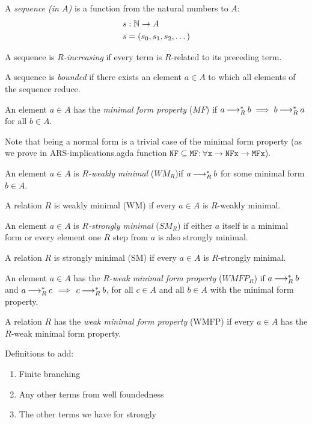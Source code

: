 \begin{definition}
    A \emph{sequence (in $A$)} is a function from the natural numbers to $A$:
    \begin{align*}
      &s : \mathbb{N} \to A \\
      &s = (s_0,s_1,s_2,\dots)
    \end{align*}
\end{definition}

\begin{definition}
    A sequence is \emph{$R$-increasing} if every term is $R$-related to its preceding term.
\end{definition}

\begin{definition}
    A sequence is \emph{bounded} if there exists an element $a \in A$ to which all elements of the sequence reduce.
\end{definition}

\begin{definition}
    An element $a \in A$ has the \emph{minimal form property} ($MF$) if $a \mathbin{\longrightarrow_R^*} b \implies b \mathbin{\longrightarrow_R^*} a$ for all $b \in A$.
\end{definition}

Note that being a normal form is a trivial case of the minimal form property (as we prove in ARS-implications.agda
function $\mathtt{NF\subseteq MF : \forall {x} \to NF x \to MF x}$).

\begin{definition}
    An element $a \in A$ is \emph{$R$-weakly minimal} ($WM_{R}$)if $a \mathbin{\longrightarrow_R^*} b$ for some minimal form $b \in A$.

    A relation $R$ is weakly minimal (WM) if every $a \in A$ is $R$-weakly minimal.
\end{definition}

\begin{definition}
    An element $a \in A$ is \emph{$R$-strongly minimal} ($SM_R$) if either $a$ itself is a minimal form or every element one $R$ step
    from $a$ is also strongly minimal.

    A relation $R$ is strongly minimal (SM) if every
    $a \in A$ is $R$-strongly minimal.
\end{definition}

\begin{definition}
   An element $a \in A$ has the \emph{${R}$-weak minimal form property} ($WMFP_R$) if
   $a \mathbin{\longrightarrow_R^*} b$ and $a \mathbin{\longrightarrow_R^*} c$  $\implies$
   $c \mathbin{\longrightarrow_R^*} b$, for all $c \in A$ and all $b \in A$ with the minimal form property.

   A relation $R$ has the \emph{weak minimal form property} (WMFP) if every $a \in A$ has the $R$-weak minimal form property.
\end{definition}

Definitions to add:
\begin{enumerate}
    \item Finite branching
    \item Any other terms from well foundedness
    \item The other terms we have for strongly
\end{enumerate}
